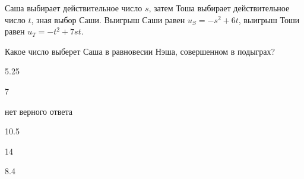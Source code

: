 
\begin{question}
Саша выбирает действительное число \(s\), затем Тоша выбирает
действительное число \(t\), зная выбор Саши. Выигрыш Саши равен
\(u_S = -s^2 + 6t\), выигрыш Тоши равен \(u_T = -t^2 + 7 st\).

Какое число выберет Саша в равновесии Нэша, совершенном в подыграх?
\begin{answerlist}
  \item 5.25
  \item 7
  \item нет верного ответа
  \item 10.5
  \item 14
  \item 8.4
\end{answerlist}
\end{question}


